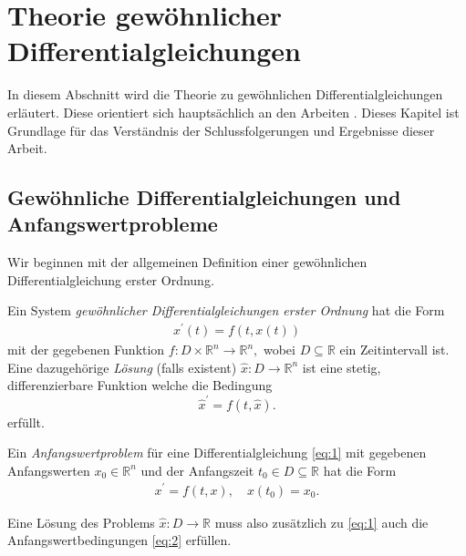 \section{Theorie gewöhnlicher Differentialgleichungen}
\label{sec:theorie}
In diesem Abschnitt wird die Theorie zu gewöhnlichen Differentialgleichungen erläutert. Diese orientiert sich
hauptsächlich an den Arbeiten \cite{peterdeuflhardfolkmarbornemannNumerischeMathematikGewohnliche,
ernsthairergerhardwannerSolvingOrdinaryDifferential,berndaulbachGewohnlicheDifferentialgleichungen2004}.
Dieses Kapitel ist Grundlage für das Verständnis der Schlussfolgerungen und Ergebnisse dieser Arbeit.

\subsection{Gewöhnliche Differentialgleichungen und Anfangswertprobleme}
Wir beginnen mit der allgemeinen Definition einer gewöhnlichen Differentialgleichung erster Ordnung.
\begin{definition}
    Ein System {\em gewöhnlicher Differentialgleichungen erster Ordnung} hat die Form
    \begin{align}
        x^{\prime}(t) = f(t, x(t)) \label{eq:1}
    \end{align}
    mit der gegebenen Funktion
    $
    f : D \times \mathbb{R}^{n} \rightarrow \mathbb{R}^{n},
    $
    wobei $D \subseteq \mathbb{R}$ ein Zeitintervall ist. Eine dazugehörige {\em Lösung} (falls existent)
    $\hat{x} : D \rightarrow \mathbb{R}^n$ ist eine stetig, differenzierbare Funktion welche die Bedingung
    \[
        \hat{x}^{\prime} = f(t, \hat{x}).
    \]
    erfüllt.
\end{definition}
\begin{definition}
    Ein {\em Anfangswertproblem} für eine Differentialgleichung \eqref{eq:1} mit gegebenen Anfangswerten
    $x_{0} \in \mathbb{R}^{n}$ und der Anfangszeit $t_0 \in D \subseteq \mathbb{R}$ hat die Form
    \begin{align}
        x^{\prime} = f(t, x),\quad x(t_{0})=x_{0}. \label{eq:2}
    \end{align}
\end{definition}
Eine Lösung des Problems $\hat{x} : D \rightarrow \mathbb{R}$ muss also zusätzlich zu \eqref{eq:1} auch die
Anfangswertbedingungen \eqref{eq:2} erfüllen.
